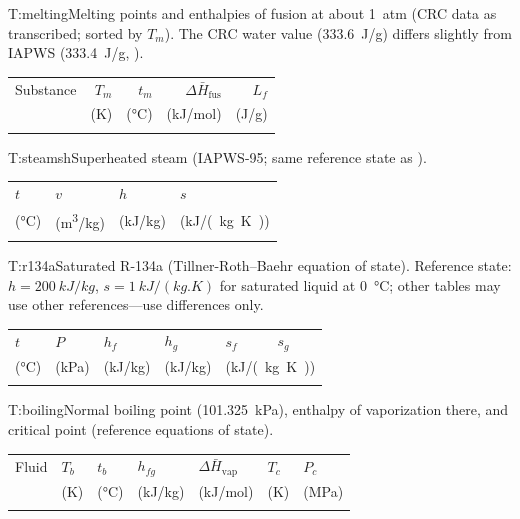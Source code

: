 \Needspace{0.45\textheight}
\begin{multicols}{2}
\begin{reftab}{T:melting}{Melting points and enthalpies of fusion at about 1~atm (CRC data as transcribed; sorted by $T_m$). The CRC water value (\SI{333.6}{J/g}) differs slightly from IAPWS (\SI{333.4}{J/g}, ).}
\small
\begin{tabularx}{\linewidth}{@{}Yrrrr@{}}
\toprule
Substance & $T_m$ & $t_m$ & $\Delta\bar H_{\text{fus}}$ & $L_f$\\
 & (K) & (\si{\celsius}) & (\si{kJ/mol}) & (\si{J/g})\\
\midrule
{}
\bottomrule
\end{tabularx}\end{reftab}

\begin{reftab}{T:steamsh}{Superheated steam (IAPWS-95; same reference state as ).}
\small
\begin{tabularx}{\linewidth}{@{}YYYY@{}}
\toprule
$t$ & $v$ & $h$ & $s$\\
(\si{\celsius}) & (\si{m^3/kg}) & (\si{kJ/kg}) & (\si{kJ/(kg.K)})\\
\midrule
{}
\bottomrule
\end{tabularx}\end{reftab}

\begin{reftab}{T:r134a}{Saturated R-134a (Tillner-Roth--Baehr equation of state). Reference state: $h=\SI{200}{kJ/kg}$, $s=\SI{1}{kJ/(kg.K)}$ for saturated liquid at \SI{0}{\celsius}; other tables may use other references---use differences only.}
\small
\begin{tabularx}{\linewidth}{@{}YYYYYY@{}}
\toprule
$t$ & $P$ & $h_f$ & $h_g$ & $s_f$ & $s_g$\\
(\si{\celsius}) & (\si{kPa}) & (\si{kJ/kg}) & (\si{kJ/kg}) & \\
\midrule
{}
\bottomrule
\end{tabularx}\end{reftab}
\end{multicols}

\begin{reftab}{T:boiling}{Normal boiling point (\SI{101.325}{kPa}), enthalpy of vaporization there, and critical point (reference equations of state).}
\small
\begin{tabularx}{\textwidth}{@{}lYYYYYY@{}}
\toprule
Fluid & $T_b$ & $t_b$ & $h_{fg}$ & $\Delta\bar H_{\text{vap}}$ & $T_c$ & $P_c$\\
 & (K) & (\si{\celsius}) & (\si{kJ/kg}) & (\si{kJ/mol}) & (K) & (MPa)\\
\midrule
{}
\bottomrule
\end{tabularx}\end{reftab}

